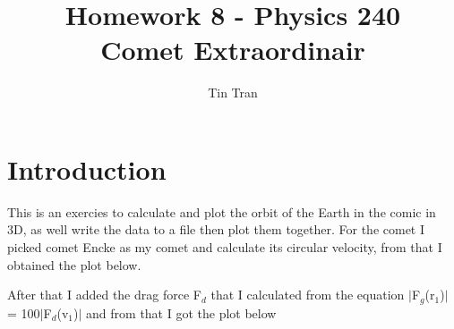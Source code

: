 \documentclass{article}
\begin{document}
\title{Homework 8 - Physics 240\\
		Comet Extraordinair}
\author{Tin Tran}

\maketitle

\section{Introduction}
This is an exercies to calculate and plot the orbit of the Earth in the comic in 3D, as well write the data to a file then plot them together.
For the comet I picked comet Encke as my comet and calculate its circular velocity, from that I obtained the plot below.
\begin{figure}[H]
\end{figure}

After that I added the drag force F$_d$ that I calculated from the equation $|$F$_g$(r$_1$)$|$ = 100$|$F$_d$(v$_1$)$|$ and from that I got the plot below
\end{document}
